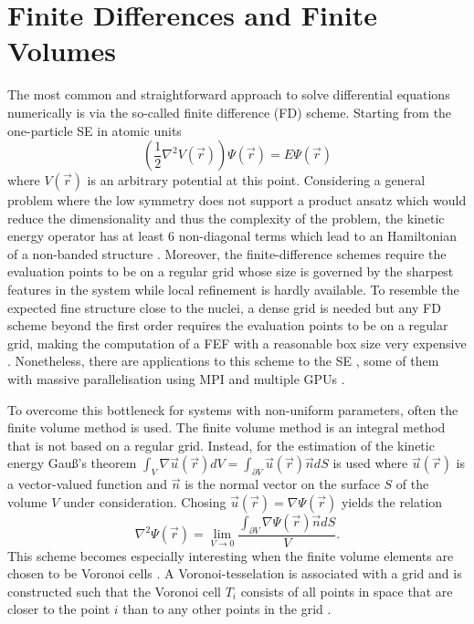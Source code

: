\section{Finite Differences and Finite Volumes}
\label{ch:FD}
The most common and straightforward approach to solve differential equations numerically is via the so-called finite difference (FD) scheme.
Starting from the one-particle SE in atomic units
\begin{equation} 
\left( \frac 12 \nabla^2 V(\vec{r}) \right) \Psi(\vec{r})=E\Psi(\vec{r})
\end{equation}
where $V(\vec{r})$ is an arbitrary potential at this point.
Considering a general problem where the low symmetry does not support a product ansatz which would reduce the dimensionality and thus the complexity of the problem, the kinetic energy operator has at least $6$ non-diagonal terms which lead to an Hamiltonian of a non-banded structure \cite{fd_Cart}.
Moreover, the finite-difference schemes require the evaluation points to be on a regular grid whose size is governed by the sharpest features in the system while local refinement is hardly available.
To resemble the expected fine structure close to the nuclei, a dense grid is needed but any FD scheme beyond the first order requires the evaluation points to be on a regular grid, making the computation of a FEF with a reasonable box size very expensive \cite{richardsFD}.
Nonetheless, there are applications to this scheme to the SE \cite{fd_Cart,fd_Cart2}, some of them with massive parallelisation using MPI and multiple GPUs \cite{fd_gpu}.

To overcome this bottleneck for systems with non-uniform parameters, often the finite volume method is used.
The finite volume method is an integral method that is not based on a regular grid.
Instead, for the estimation of the kinetic energy Gau\ss's theorem $\int_V \nabla \vec{u}(\vec{r}) dV=\int_{\partial V} \vec{u}(\vec{r}) \vec{n}dS $ is used where $\vec{u}(\vec{r})$ is a vector-valued function and $\vec{n}$ is the normal vector on the surface $S$ of the volume $V$ under consideration.
Chosing $\vec{u}(\vec{r})=\nabla\Psi(\vec{r})$ yields the relation
\begin{equation} \label{eq:kinFV}
   \nabla^2\Psi(\vec{r})=\lim_{V\rightarrow 0} \frac{ \int_{\partial V} \nabla\Psi(\vec{r}) \vec{n} dS}{V}.
\end{equation}
This scheme becomes especially interesting when the finite volume elements are chosen to be Voronoi cells \cite{Son_Chu0}.
A Voronoi-tesselation is associated with a grid and is constructed such that the Voronoi cell $T_i$ consists of all points in space that are closer to the point $i$ than to any other points in the grid \cite{voronoi,voronoi1,voronoi2}.

